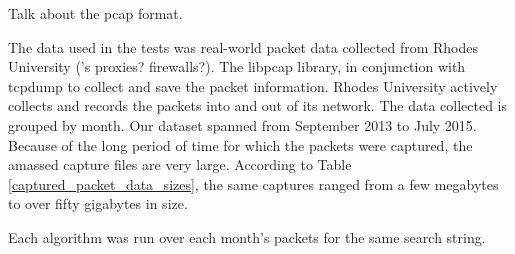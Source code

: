 \documentclass{article}
\begin{document}
Talk about the pcap format.

The data used in the tests was real-world packet data collected from Rhodes University ('s proxies? firewalls?). The libpcap library, in conjunction with tcpdump to collect and save the packet information. Rhodes University actively collects and records the packets into and out of its network. The data collected is grouped by month. Our dataset spanned from September 2013 to July 2015. Because of the long period of time for which the packets were captured, the amassed capture files are very large. According to Table \ref{captured_packet_data_sizes}, the same captures ranged from a few megabytes to over fifty gigabytes in size.

Each algorithm was run over each month's packets for the same search string. 

\begin{comment}
 To get the size of each file:
    $ find . -name '*.cap' | xargs du -h
 To get the number of packets in each file:
    $ find . -name '*.pcap' | xargs wc
 The previous one may be incorrect.
\end{comment}
\end{document}
